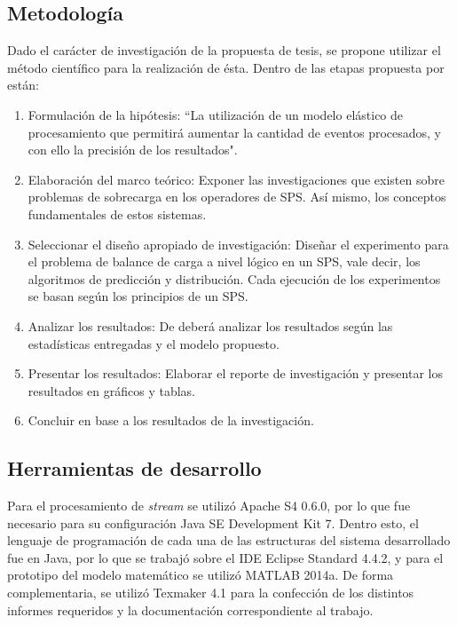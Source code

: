 \subsection{Metodología}
Dado el carácter de investigación de la propuesta de tesis, se propone utilizar el método científico para la realización de ésta. Dentro de las etapas propuesta por \citep{hernandez2010metodologia} están:

\begin{enumerate}
	\item Formulación de la hipótesis: ``La utilización de un modelo elástico de procesamiento que permitirá aumentar la cantidad de eventos procesados, y con ello la precisión de los resultados".
	\item Elaboración del marco teórico: Exponer las investigaciones que existen sobre problemas de sobrecarga en los operadores de SPS. Así mismo, los conceptos fundamentales de estos sistemas.
	\item Seleccionar el diseño apropiado de investigación: Diseñar el experimento para el problema de balance de carga a nivel lógico en un SPS, vale decir, los algoritmos de predicción y distribución. Cada ejecución de los experimentos se basan según los principios de un SPS.
	\item Analizar los resultados: De deberá analizar los resultados según las estadísticas entregadas y el modelo propuesto.
	\item Presentar los resultados: Elaborar el reporte de investigación y presentar los resultados en gráficos y tablas.
	\item Concluir en base a los resultados de la investigación.
\end{enumerate}

\subsection{Herramientas de desarrollo}
Para el procesamiento de \textit{stream} se utilizó Apache S4 0.6.0, por lo que fue necesario para su configuración Java SE Development Kit 7. Dentro esto, el lenguaje de programación de cada una de las estructuras del sistema desarrollado fue en Java, por lo que se trabajó sobre el IDE Eclipse Standard 4.4.2, y para el prototipo del modelo matemático se utilizó MATLAB 2014a. De forma complementaria, se utilizó Texmaker 4.1 para la confección de los distintos informes requeridos y la documentación correspondiente al trabajo.

